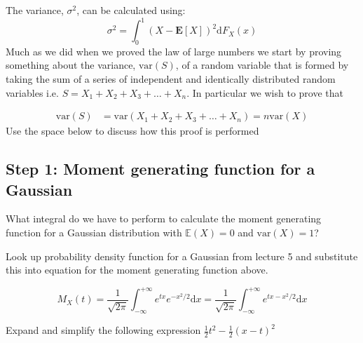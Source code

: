 \documentclass[paper=a4, fontsize=11pt]{scrartcl}
\newcommand{\red}[1]{{\color{red}#1}}
\numberwithin{equation}{section}
\numberwithin{figure}{section}
\numberwithin{table}{section}
\begin{document}
The variance, $\sigma^2$, can be calculated using:
%
\begin{equation}
 \sigma^2 = \int_0^1 (X - \mathbf{E}[X])^2 \textrm{d}F_X(x)
\end{equation}
%
Much as we did when we proved the law of large numbers we start by proving something about the variance, $\textrm{var}(S)$, of a random variable that is formed by taking
the sum of a series of independent and identically distributed random variables i.e. $S = X_1 + X_2 + X_3 + \dots + X_n$.  In particular we wish to prove that 

\begin{equation}
\begin{aligned}
 \textrm{var}(S) & = \textrm{var}( X_1 + X_2 + X_3 + \dots + X_n ) = n \textrm{var}(X) 
 \end{aligned}
\end{equation}
%
Use the space below to discuss how this proof is performed

\vspace{3cm}


\subsection{Step 1: Moment generating function for a Gaussian}

\noindent What integral do we have to perform to calculate the moment generating
function for a Gaussian distribution with $\mathbb{E}(X)=0$ and
$\textrm{var}(X)=1$? 

\begin{answers}
\vspace{1cm}
\red{
 Look up probability density function for a Gaussian from lecture 5 and
substitute this into equation
 for the moment generating function above.
 
 \begin{equation}
 M_X(t) = \frac{1}{\sqrt{2\pi}} \int_{-\infty}^{+\infty} e^{tx} e^{-x^2/2}
\textrm{d}x =  \frac{1}{\sqrt{2\pi}} \int_{-\infty}^{+\infty} e^{tx-x^2/2}
\textrm{d}x
 \end{equation} 
}
\end{answers}

\clearpage

\noindent Expand and simplify the following expression $\frac{1}{2}t^2 -
\frac{1}{2}(x-t)^2$ 

\begin{questions}
\vspace{2cm}
\end{questions}
\end{document}
